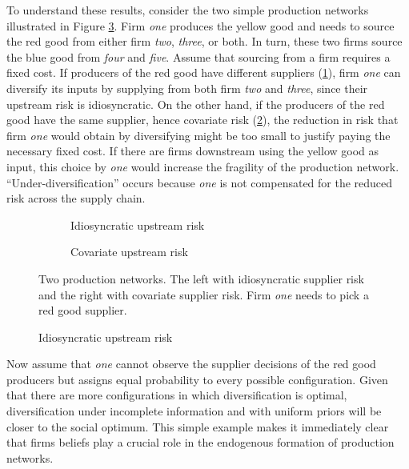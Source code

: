 \documentclass[american, abstract=on]{scrartcl}
\newcommand{\inputTikZ}[2]{%
      \scalebox{#1}{}  
    }
\begin{document}
To understand these results, consider the two simple production networks illustrated in Figure \ref{fig:example}. Firm \textit{one} produces the yellow good and needs to source the red good from either firm \textit{two}, \textit{three}, or both. In turn, these two firms source the blue good from \textit{four} and \textit{five}. Assume that sourcing from a firm requires a fixed cost. If producers of the red good have different suppliers (\ref{fig:example:idio}), firm \textit{one} can diversify its inputs by supplying from both firm \textit{two} and \textit{three}, since their upstream risk is idiosyncratic. On the other hand, if the producers of the red good have the same supplier, hence covariate risk (\ref{fig:example:cov}), the reduction in risk that firm \textit{one} would obtain by diversifying might be too small to justify paying the necessary fixed cost. If there are firms downstream using the yellow good as input, this choice by \textit{one} would increase the fragility of the production network. ``Under-diversification'' occurs because \textit{one} is not compensated for the reduced risk across the supply chain.

\begin{figure}[H]
  \centering
  \begin{subfigure}{.5\textwidth}
    \centering
    \inputTikZ{0.5}{../diagrams/example-idio.tikz} 
    \caption{Idiosyncratic upstream risk}
    \label{fig:example:idio}  
  \end{subfigure}%
  \begin{subfigure}{.5\textwidth}
    \centering
    \inputTikZ{0.5}{../diagrams/example-covariate.tikz} 
    \caption{Covariate upstream risk}
    \label{fig:example:cov}
  \end{subfigure}
  \caption{Two production networks. The left with idiosyncratic supplier risk and the right with covariate supplier risk. Firm \textit{one} needs to pick a red good supplier.}
  \label{fig:example}
\end{figure}


\begin{figure}[H]
  \centering
  \inputTikZ{0.5}{../diagrams/model-presentation.tikz} 
  \caption{Idiosyncratic upstream risk}
\end{figure}

Now assume that \textit{one} cannot observe the supplier decisions of the red good producers but assigns equal probability to every possible configuration. Given that there are more configurations in which diversification is optimal, diversification under incomplete information and with uniform priors will be closer to the social optimum. This simple example makes it immediately clear that firms beliefs play a crucial role in the endogenous formation of production networks. 
\end{document}
